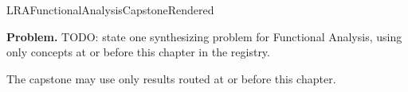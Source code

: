 \ifcsname LRAFunctionalAnalysisCapstoneRendered\endcsname
\else
\expandafter\gdef\csname LRAFunctionalAnalysisCapstoneRendered\endcsname{}

\newpage
{}
\label{cap:functional-analysis}

\begin{tcolorbox}[
  colback=gray!6,
  colframe=gray!40,
  arc=2pt,
  left=8pt, right=8pt, top=6pt, bottom=6pt,
  title={\small\textbf{Capstone Problem}},
  fonttitle=\small\bfseries
]
\textbf{Problem.}
TODO: state one synthesizing problem for Functional Analysis, using only concepts at or
before this chapter in the registry.
\end{tcolorbox}

\begin{remark*}
The capstone may use only results routed at or before this chapter.
\end{remark*}

\clearpage
\fi
